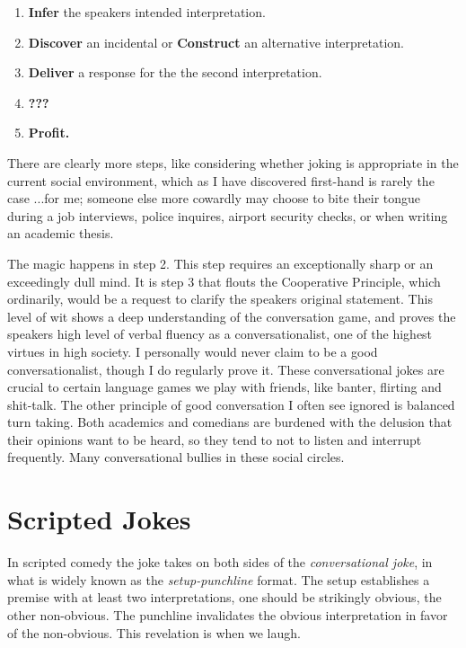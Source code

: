 \begin{enumerate}

    \item \textbf{Infer} the speakers intended interpretation.
    \item \textbf{Discover} an incidental or \textbf{Construct} an alternative interpretation.
    \item \textbf{Deliver} a response for the the second interpretation.
    \item \textbf{???}
    \item \textbf{Profit.}

\end{enumerate}

There are clearly more steps, like considering whether joking is appropriate in the current social environment, which as I have discovered first-hand is rarely the case ...for me; someone else more cowardly may choose to bite their tongue during a job interviews, police inquires, airport security checks, or when writing an academic thesis. 

The magic happens in step 2. This step requires an exceptionally sharp or an exceedingly dull mind. It is step 3 that flouts the Cooperative Principle, which ordinarily, would be a request to clarify the speakers original statement. This level of wit shows a deep understanding of the conversation game, and proves the speakers high level of verbal fluency as a conversationalist, one of the highest virtues in high society. I personally would never claim to be a good conversationalist, though I do regularly prove it. These conversational jokes are crucial to certain language games we play with friends, like banter, flirting and shit-talk. The other principle of good conversation I often see ignored is balanced turn taking. Both academics and comedians are burdened with the delusion that their opinions want to be heard, so they tend to not to listen and interrupt frequently. Many conversational bullies in these social circles.

\section{Scripted Jokes}
In scripted comedy the joke takes on both sides of the \textit{conversational joke}, in what is widely known as the \textit{setup-punchline} format. The setup establishes a premise with at least two interpretations, one should be strikingly obvious, the other non-obvious. The punchline invalidates the obvious interpretation in favor of the non-obvious. This revelation is when we laugh. 

